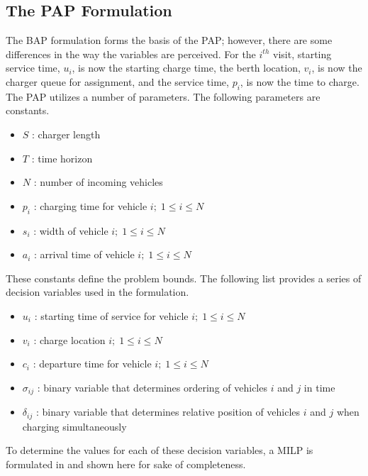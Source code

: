 \documentclass[utf8]{FrontiersinHarvard}
\let\cite\citep                                                                 %
\begin{document}
\subsection{The PAP Formulation}
The BAP formulation forms the basis of the PAP; however, there are some differences in the way the variables are
perceived. For the $i^{th}$ visit, starting service time, $u_i$, is now the starting charge time, the berth location,
$v_i$, is now the charger queue for assignment, and the service time, $p_i$, is now the time to charge. The PAP utilizes
a number of parameters. The following parameters are constants.
\begin{itemize}
	\item $S$   : charger length
	\item $T$   : time horizon
	\item $N$   : number of incoming vehicles
	\item $p_i$ : charging time for vehicle $i;\; 1 \leq i \leq N$
	\item $s_i$ : width of vehicle $i;\; 1 \leq i \leq N$
	\item $a_i$ : arrival time of vehicle $i;\; 1 \leq i \leq N$
\end{itemize}

These constants define the problem bounds. The following list provides a series of decision variables used in the
formulation.

\begin{itemize}
    \item $u_i$    : starting time of service for vehicle $i;\; 1 \leq i \leq N$
    \item $v_i$    : charge location $i;\; 1 \leq i \leq N$
    \item $c_i$    : departure time for vehicle $i;\; 1 \leq i \leq N$
    \item $\sigma_{ij}$ : binary variable that determines ordering of vehicles $i$ and $j$ in time
    \item $\delta_{ij}$ : binary variable that determines relative position of vehicles $i$ and $j$ when charging simultaneously
\end{itemize}

To determine the values for each of these decision variables, a MILP is formulated in \cite{Qarebagh2019} and shown
here for sake of completeness.
\end{document}
